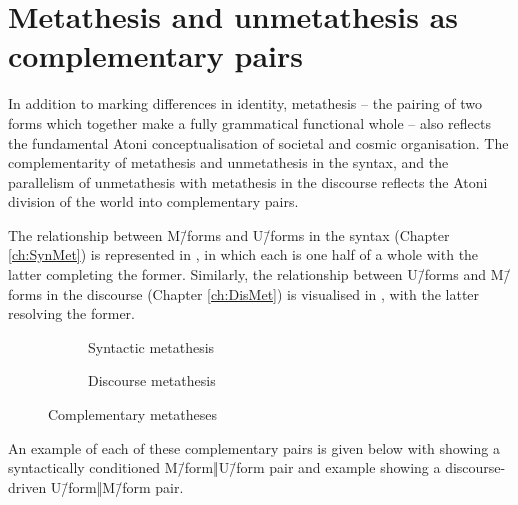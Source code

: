\section{Metathesis and unmetathesis as complementary pairs}\label{sec:MetPar}
In addition to marking differences in identity,
metathesis -- the pairing of two forms which together make a fully grammatical functional whole --
also reflects the fundamental Atoni
conceptualisation of societal and cosmic organisation.
The complementarity of metathesis and unmetathesis in the syntax,
and the parallelism of unmetathesis with metathesis in the discourse
reflects the Atoni division of the world into complementary pairs.

The relationship between M\=/forms and U\=/forms in the syntax (Chapter \ref{ch:SynMet})
is represented in ,
in which each is one half of a whole with the latter completing the former.
Similarly, the relationship between U\=/forms and M\=/forms in the discourse (Chapter \ref{ch:DisMet})
is visualised in ,
with the latter resolving the former.

\begin{figure}[ht]
  \begin{subfigure}[b]{0.49\textwidth}
		\caption{Syntactic metathesis}\label{fig:SynMet}
  \end{subfigure}
  \begin{subfigure}[b]{0.49\textwidth}
		\caption{Discourse metathesis}\label{fig:DisMet}
  \end{subfigure}
	\caption{Complementary metatheses}\label{fig:CompMet}
\end{figure}

An example of each of these complementary pairs
is given below with 
showing a syntactically conditioned M\=/form‖U\=/form pair and example
 showing a discourse-driven U\=/form‖M\=/form pair.

